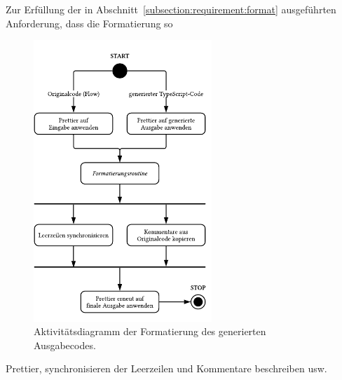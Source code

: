 Zur Erfüllung der in Abschnitt~\ref{subsection:requirement:format} ausgeführten Anforderung, dass die Formatierung so

\begin{figure}[htbp]
  \centering
  \includegraphics[width=0.6\textwidth]{src/4_Umsetzung/fig/activity-diagram-formatting.pdf}
	\caption[Aktivitätsdiagramm der Formatierung des Ausgabecodes]{Aktivitätsdiagramm der Formatierung des generierten Ausgabecodes.}
	\label{fig:activity-diagram-formatting}
\end{figure}

Prettier, synchronisieren der Leerzeilen und Kommentare beschreiben usw.
